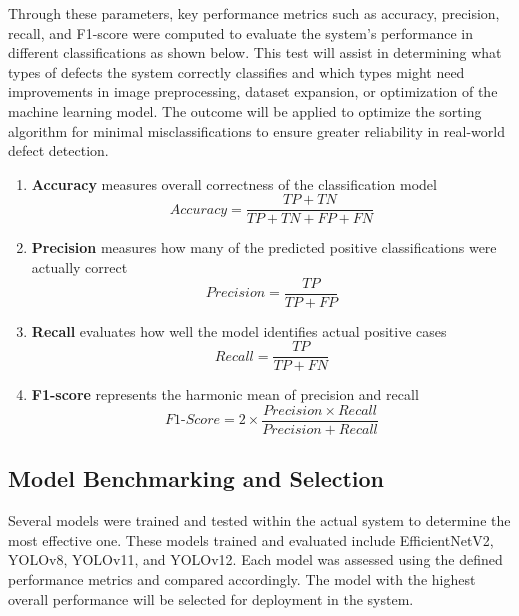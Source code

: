 Through these parameters, key performance metrics such as accuracy, precision, recall, and F1-score were computed to evaluate the system’s performance in different classifications as shown below. This test will assist in determining what types of defects the system correctly classifies and which types might need improvements in image preprocessing, dataset expansion, or optimization of the machine learning model. The outcome will be applied to optimize the sorting algorithm for minimal misclassifications to ensure greater reliability in real-world defect detection.

\begin{enumerate}
	\item \textbf{Accuracy} measures overall correctness of the classification model
	\begin{equation}
	Accuracy = \frac{TP + TN}{TP + TN + FP + FN}
	\end{equation}

	\item \textbf{Precision} measures how many of the predicted positive classifications were actually correct
	\begin{equation}
	Precision = \frac{TP}{TP + FP}
	\end{equation}

	\item \textbf{Recall} evaluates how well the model identifies actual positive cases
	\begin{equation}
	Recall = \frac{TP}{TP + FN}
	\end{equation}
	
	\item \textbf{F1-score} represents the harmonic mean of precision and recall
	\begin{equation}
	F1\text{-}Score = 2 \times \frac{Precision \times Recall}{Precision + Recall}
	\end{equation}
\end{enumerate}

\subsection{Model Benchmarking and Selection}
Several models were trained and tested within the actual system to determine the most effective one. These models trained and evaluated include EfficientNetV2, YOLOv8, YOLOv11, and YOLOv12. Each model was assessed using the defined performance metrics and compared accordingly. The model with the highest overall performance will be selected for deployment in the system.


